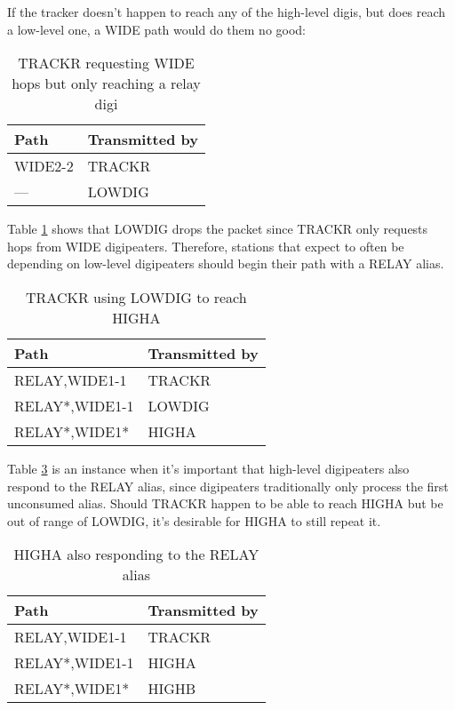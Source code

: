 If the tracker doesn't happen to reach any of the high-level digis, 
but does reach a low-level one, a WIDE path would do them no good:

\begin{table}[!h]
	\centering
	\begin{tabular}{ | l | l | }
		\hline
		Path & Transmitted by \\ \hline
		WIDE2-2 & TRACKR \\ \hline
		--- & LOWDIG \\ \hline
	\end{tabular}
	\caption{TRACKR requesting WIDE hops but only reaching a relay digi}
	\label{tab:lowhearswide}
\end{table}

Table \ref{tab:lowhearswide} shows that LOWDIG drops the packet since
TRACKR only requests hops from WIDE digipeaters.
Therefore, stations that expect to often be depending on low-level
digipeaters should begin their path with a RELAY alias.

\begin{table}[!h]
	\centering
	\begin{tabular}{ | l | l | }
		\hline
		Path & Transmitted by \\ \hline
		RELAY,WIDE1-1 & TRACKR \\ \hline
		RELAY*,WIDE1-1 & LOWDIG \\ \hline
		RELAY*,WIDE1* & HIGHA \\ \hline
	\end{tabular}
	\caption{TRACKR using LOWDIG to reach HIGHA}
	\label{tab:usingrelay}
\end{table}

Table \ref{tab:usingrelay} is an instance when it's important that high-level
digipeaters also respond to the RELAY alias, since digipeaters traditionally
only process the first unconsumed alias.
Should TRACKR happen to be able to reach HIGHA but be out of range of LOWDIG,
it's desirable for HIGHA to still repeat it.
\begin{table}[!h]
	\centering
	\begin{tabular}{ | l | l | }
		\hline
		Path & Transmitted by \\ \hline
		RELAY,WIDE1-1 & TRACKR \\ \hline
		RELAY*,WIDE1-1 & HIGHA \\ \hline
		RELAY*,WIDE1* & HIGHB \\ \hline
	\end{tabular}
	\caption{HIGHA also responding to the RELAY alias}
	\label{tab:usingrelay}
\end{table}

